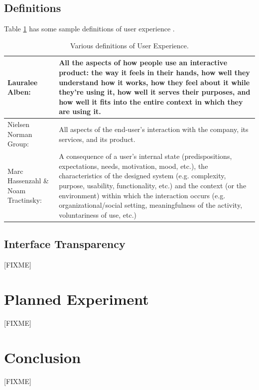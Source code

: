 \documentclass{acm_proc_article-sp}
\begin{document}
\subsection{Definitions}
Table \ref{tab:definitions} has some sample definitions of user
experience \citep{definition:law}.

\begin{table}[!t]
  \caption{Various definitions of User Experience.}
  \label{tab:definitions}
  \begin{center}
    \begin{tabular}{| p{} || p{} |}
      \hline

      Lauralee Alben: & All the aspects of how people use an
      interactive product: the way it feels in their hands, how well
      they understand how it works, how they feel about it while
      they're using it, how well it serves their purposes, and how
      well it fits into the entire context in which they are using
      it. \\ \hline

      Nielsen Norman Group: & All aspects of the end-user's
      interaction with the company, its services, and its
      product. \\ \hline

      Marc Hassenzahl \& Noam Tractinsky: & A consequence of a user's
      internal state (predispositions, expectations, needs,
      motivation, mood, etc.), the characteristics of the designed
      system (e.g. complexity, purpose, usability, functionality,
      etc.) and the context (or the environment) within which the
      interaction occurs (e.g. organizational/social setting,
      meaningfulness of the activity, voluntariness of use, etc.)
      \\ \hline
    \end{tabular}
  \end{center}
\end{table}

\subsection{Interface Transparency}
[FIXME]



\section{Planned Experiment}
\label{sec:experiment}
[FIXME]


\section{Conclusion}
\label{sec:conclusion}
[FIXME]




\end{document}
